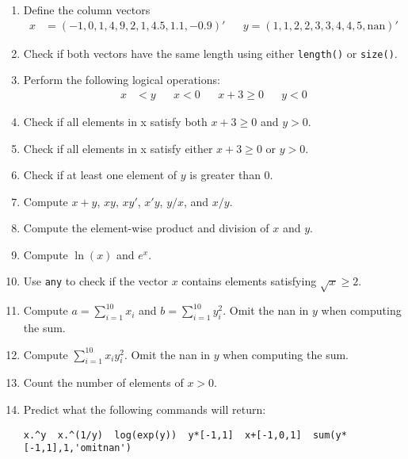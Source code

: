 \begin{enumerate}

\item
Define the column vectors
\begin{align*}
x &= \left(-1,0,1,4,9,2,1,4.5,1.1,-0.9\right)' && y =\left(1,1,2,2,3,3,4,4,5,\text{nan}\right)'
\end{align*}

\item
Check if both vectors have the same length using either \texttt{length{()}} or \texttt{size{()}}.

\item
Perform the following logical operations:
\begin{align*}
x&<y && x<0 && x+3\geq0 && y<0
\end{align*}

\item
Check if all elements in x satisfy both \(x + 3 \geq 0\) and \(y > 0\).

\item
Check if all elements in x satisfy either \(x + 3 \geq 0\) or \(y > 0\).

\item
Check if at least one element of \(y\) is greater than \(0\).

\item
Compute \(x+y\), \(xy\), \(xy'\), \(x'y\), \(y/x\), and \(x/y\).

\item
Compute the element-wise product and division of \(x\) and \(y\).

\item
Compute \(\ln(x)\) and \(e^x\).

\item
Use \texttt{any} to check if the vector \(x\) contains elements satisfying \(\sqrt{x} \geq 2\).

\item
Compute \(a = \sum_{i=1}^{10} x_{i}\) and \(b = \sum_{i=1}^{10} y_{i}^{2}\).
Omit the nan in \(y\) when computing the sum.

\item
Compute \(\sum_{i=1}^{10} x_{i} y_{i}^{2}\).
Omit the nan in \(y\) when computing the sum.

\item
Count the number of elements of \(x>0\).

\item
Predict what the following commands will return:
\begin{verbatim}
x.^y  x.^(1/y)  log(exp(y))  y*[-1,1]  x+[-1,0,1]  sum(y*[-1,1],1,'omitnan')
\end{verbatim}


\end{enumerate}

